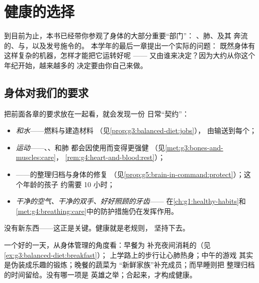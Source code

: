 \chapter{健康的选择}\label{ch:g5:healthy-choices}

到目前为止，本书已经带你参观了身体的大部分重要“部门”：
、肺、及其
奔流的、与，以及发号施令的。
本学年的最后一章提出一个实际的问题：
既然身体有这样复杂的机器，怎样才能把它运转好呢 ——
又由谁来决定？因为大约从你这个年纪开始，越来越多的
决定要由你自己来做。

\section{身体对我们的要求}

\begin{proposition}[身体的日常“契约”]\label{prop:g5:healthy-choices:contract}
把前面各章的要求放在一起看，就会发现一份
日常“契约”：
\begin{itemize}
  \item \emph{和水}——燃料与建造材料
        （见\cref{prop:g3:balanced-diet:jobs}），
        由输送到每个；
  \item \emph{运动}——、、和肺
        都会因使用而变得更强健
        （见\cref{met:g3:bones-and-muscles:care}，
        \cref{rem:g4:heart-and-blood:rest}）；
  \item \emph{}——的整理归档与身体的修复
        （见\cref{prop:g5:brain-in-command:protect}）；这个年龄的孩子
        约需要 10 小时；
  \item \emph{干净的空气、干净的双手、好好照顾的牙齿}——
        在\cref{ch:g1:healthy-habits}和
        \cref{met:g4:breathing:care}中的防护措施仍在发挥作用。
\end{itemize}
没有新东西——这正是关键。健康就是老规则，
坚持下去。
\end{proposition}
\admitted

\begin{example}[从身体内部看的一天]\label{ex:g5:healthy-choices:day}
一个好的一天，从身体管理的角度看：早餐为
补充夜间消耗的（见\cref{ex:g3:balanced-diet:breakfast}）；
上学路上的步行让心肺热身；中午的游戏
其实是伪装成乐趣的锻炼；晚餐的蔬菜为
“新鲜家族”补充成员；而早睡则把
整理归档的时间留给。没有哪一项是
英雄之举；合起来，才构成健康。
\end{example}

